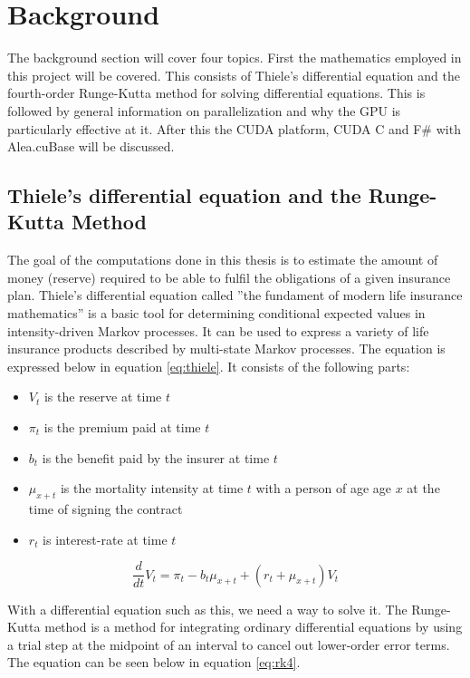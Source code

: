 \section{Background}
The background section will cover four topics.
First the mathematics employed in this project will be covered. This consists of Thiele's differential equation and the fourth-order Runge-Kutta method for solving differential equations.
This is followed by general information on parallelization and why the GPU is particularly effective at it.
After this the CUDA platform, CUDA C and F\# with Alea.cuBase will be discussed.


\subsection{Thiele's differential equation and the Runge-Kutta Method}
The goal of the computations done in this thesis is to estimate the amount of money (reserve) required to be able to fulfil the obligations of a given insurance plan.
Thiele's differential equation\cite{thiele} called ''the fundament of modern life insurance mathematics''\cite{thiele:quote} is a basic tool for determining conditional expected values in intensity-driven Markov processes.
It can be used to express a variety of life insurance products described by multi-state Markov processes.
The equation is expressed below in equation \ref{eq:thiele}. It consists of the following parts:

\begin{itemize}
\item $V_t$ is the reserve at time $t$
\item $\pi_t$ is the premium paid at time $t$
\item $b_t$ is the benefit paid by the insurer at time $t$
\item $\mu_{x+t}$ is the mortality intensity at time $t$ with a person of age age $x$ at the time of signing the contract
\item $r_t$ is interest-rate at time $t$
\end{itemize}

\begin{equation}\label{eq:thiele}
\frac{d}{dt}V_t = \pi_t - b_t \mu_{x+t} + (r_t + \mu_{x+t}) V_t
\end{equation}

With a differential equation such as this, we need a way to solve it. 
The Runge-Kutta method\cite{runge-kutta} is a method for integrating ordinary differential equations by using a trial step at the midpoint of an interval to cancel out lower-order error terms.
The equation can be seen below in equation \ref{eq:rk4}.

